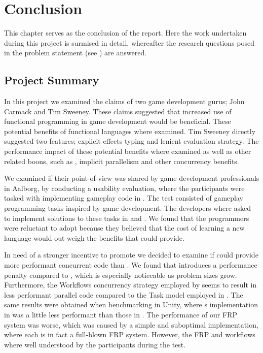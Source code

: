 \chapter{Conclusion}
This chapter serves as the conclusion of the report. Here the work undertaken during this project is surmised in detail, whereafter the research questions posed in the problem statement (see ) are answered.

\section{Project Summary}
In this project we examined the claims of two game development gurus; John Carmack and Tim Sweeney. These claims suggested that increased use of functional programming in game development would be beneficial. These potential benefits of functional languages where examined. Tim Sweeney directly suggested two features; explicit effects typing and lenient evaluation strategy. The performance impact of these potential benefits where examined as well as other related boons, such as , implicit parallelism and other concurrency benefits.

We examined if their point-of-view was shared by game development professionals in Aalborg, by conducting a usability evaluation, where the participants were tasked with implementing gameplay code in \fs. The test consisted of gameplay programming tasks inspired by game development. The developers where asked to implement solutions to these tasks in \fs and \cs. We found that the programmers were reluctant to adopt \fs because they believed that the cost of learning a new language would out-weigh the benefits that \fs could provide.

In need of a stronger incentive to promote \fs we decided to examine if \fs could provide more performant concurrent code than \cs. We found that \fs introduces a performance penalty compared to \cs, which is especially noticeable as problem sizes grow. Furthermore, the  Workflows concurrency strategy employed by \fs seems to result in less performant parallel code compared to the Task model employed in \cs. The same results were obtained when benchmarking \fs in Unity, where s implementation in \fs was a little less performant than those in \cs. The performance of our \gls{FRP} system was worse, which was caused by a simple and suboptimal implementation, where each  is in fact a full-blown \gls{FRP} system. However, the \gls{FRP} and  workflows where well understood by the participants during the test.

